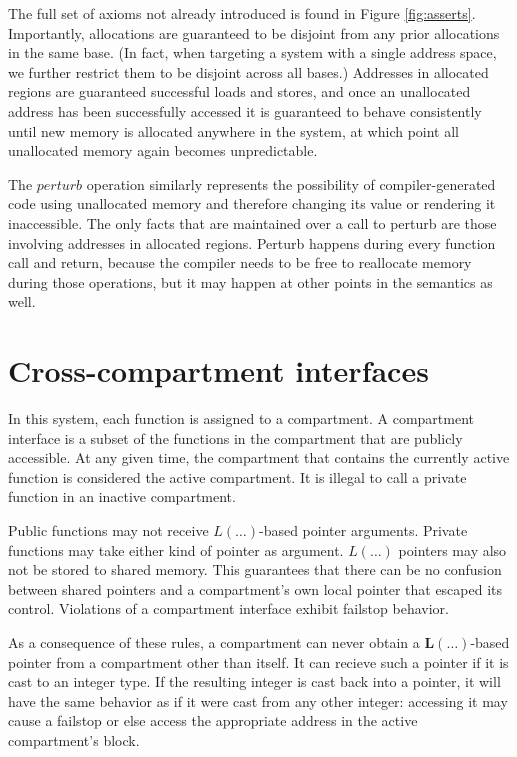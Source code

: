 \documentclass{article}
\begin{document}
The full set of axioms not already introduced is found in Figure \ref{fig:asserts}. Importantly,
allocations are guaranteed to be disjoint from any prior allocations in the same base.
(In fact, when targeting a system with a single address space, we further restrict them to be disjoint
across all bases.) Addresses in allocated regions are guaranteed successful loads and stores, and
once an unallocated address has been successfully accessed it is guaranteed to behave consistently
until new memory is allocated anywhere in the system, at which point all unallocated memory
again becomes unpredictable.

The \(\mathit{perturb}\) operation similarly represents the possibility of compiler-generated
code using unallocated memory and therefore changing its value or rendering it inaccessible.
The only facts that are maintained over a call to perturb are those involving addresses in
allocated regions. Perturb happens during every function call and return, because the compiler
needs to be free to reallocate memory during those operations, but it may happen at other points
in the semantics as well.

\section{Cross-compartment interfaces}
\label{sec:interfaces}

In this system, each function is assigned to a compartment. A compartment interface
is a subset of the functions in the compartment that are publicly accessible.
At any given time, the compartment that contains the currently active function is
considered the active compartment. It is illegal to call a private function in an
inactive compartment.

Public functions may not receive \(L(\dots)\)-based pointer arguments.
Private functions may take either kind of pointer as argument. \(L(\dots)\) pointers
may also not be stored to shared memory. This guarantees that there can be no
confusion between shared pointers and a compartment's own local pointer that
escaped its control. Violations of a compartment interface exhibit failstop behavior.

As a consequence of these rules, a compartment can never obtain a
\(\mathbf{L}(\dots)\)-based pointer from a compartment other than itself.
It can recieve such a pointer if it is cast to an integer type. If the resulting
integer is cast back into a pointer, it will have the same behavior as if it were cast
from any other integer: accessing it may cause a failstop or else access the
appropriate address in the active compartment's block.
\end{document}
